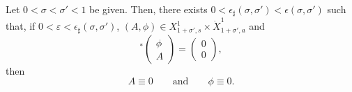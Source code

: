 \documentclass[AHL,Unicode,longabstracts,published]{cedram}
\newcommand*\e{\varepsilon}
\newcommand*\ep{\epsilon}
\newcommand*\s{\sigma}
\begin{document}
\begin{lemm}\label{adj_inj_plan}
Let $ 0 < \s < \s' < 1 $ be given. Then, there exists $ 0 < \ep_\sharp(\s, \s') < \ep (\s, \s') $ such that, if $
0<\varepsilon<\epsilon_\sharp(\sigma, \sigma')$, $ (A, \phi) \in X^{1}_{ 1+\s', s} \times \dot{X}^{1}_{ 1+ \s',a} $ and
\begin{equation*}
[\Lambda^\e]^*
\begin{pmatrix}
\phi \\ A
\end{pmatrix} =
\begin{pmatrix} 0 \\ 0
\end{pmatrix},
\end{equation*}
then
\[
A \equiv 0
\qquad \text{and} \qquad
\phi \equiv 0.
\]
\end{lemm}
\end{document}
